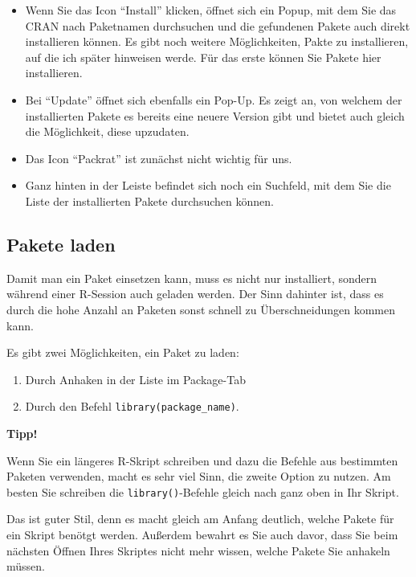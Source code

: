 \documentclass[
]{book}
\begin{document}
\begin{itemize}
\item
  Wenn Sie das Icon ``Install'' klicken, öffnet sich ein Popup, mit dem Sie das CRAN nach Paketnamen durchsuchen und die gefundenen Pakete auch direkt installieren können. Es gibt noch weitere Möglichkeiten, Pakte zu installieren, auf die ich später hinweisen werde. Für das erste können Sie Pakete hier installieren.
\item
  Bei ``Update'' öffnet sich ebenfalls ein Pop-Up. Es zeigt an, von welchem der installierten Pakete es bereits eine neuere Version gibt und bietet auch gleich die Möglichkeit, diese upzudaten.
\item
  Das Icon ``Packrat'' ist zunächst nicht wichtig für uns.
\item
  Ganz hinten in der Leiste befindet sich noch ein Suchfeld, mit dem Sie die Liste der installierten Pakete durchsuchen können.
\end{itemize}

\hypertarget{pakete-laden}{%
\subsection{Pakete laden}\label{pakete-laden}}

Damit man ein Paket einsetzen kann, muss es nicht nur installiert, sondern während einer R-Session auch geladen werden. Der Sinn dahinter ist, dass es durch die hohe Anzahl an Paketen sonst schnell zu Überschneidungen kommen kann.

Es gibt zwei Möglichkeiten, ein Paket zu laden:

\begin{enumerate}
\def\labelenumi{\arabic{enumi}.}
\item
  Durch Anhaken in der Liste im Package-Tab
\item
  Durch den Befehl \texttt{library(package\_name)}.
\end{enumerate}

\textbf{Tipp!}

Wenn Sie ein längeres R-Skript schreiben und dazu die Befehle aus bestimmten Paketen verwenden, macht es sehr viel Sinn, die zweite Option zu nutzen. Am besten Sie schreiben die \texttt{library()}-Befehle gleich nach ganz oben in Ihr Skript.

Das ist guter Stil, denn es macht gleich am Anfang deutlich, welche Pakete für ein Skript benötgt werden. Außerdem bewahrt es Sie auch davor, dass Sie beim nächsten Öffnen Ihres Skriptes nicht mehr wissen, welche Pakete Sie anhakeln müssen.
\end{document}
